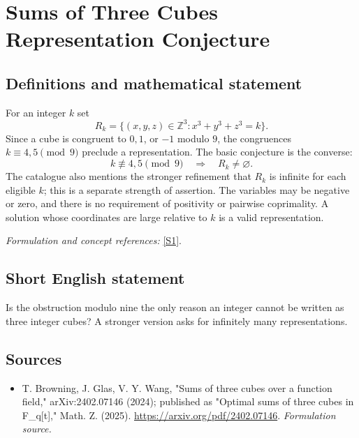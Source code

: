 \documentclass[11pt]{article}
\begin{document}
\section*{\texorpdfstring{Sums of Three Cubes Representation Conjecture}{Sums of Three Cubes Representation Conjecture}}\label{30006928}
\subsection{Definitions and mathematical statement}
For an integer $k$ set
\[
 R_k=\{(x,y,z)\in{\mathbb{Z}}^3:x^3+y^3+z^3=k\}.
\]
Since a cube is congruent to $0,1$, or $-1$ modulo $9$, the congruences $k\equiv4,5\pmod9$ preclude a representation. The basic conjecture is the converse:
\[
 k\not\equiv4,5\pmod9\quad\Longrightarrow\quad R_k\ne\varnothing.
\]
The catalogue also mentions the stronger refinement that $R_k$ is infinite for each eligible $k$; this is a separate strength of assertion. The variables may be negative or zero, and there is no requirement of positivity or pairwise coprimality. A solution whose coordinates are large relative to $k$ is a valid representation.
\par\smallskip\textit{Formulation and concept references:} \href{https://arxiv.org/pdf/2402.07146}{[S1]}.

\subsection{Short English statement}
Is the obstruction modulo nine the only reason an integer cannot be written as three integer cubes? A stronger version asks for infinitely many representations.
\subsection{Sources}
\begin{itemize}
\item[S1]T. Browning, J. Glas, V. Y. Wang, "Sums of three cubes over a function field," arXiv:2402.07146 (2024); published as "Optimal sums of three cubes in F\_q[t]," Math. Z. (2025).
\url{https://arxiv.org/pdf/2402.07146}.
\textit{Formulation source.}
\end{itemize}
\end{document}
